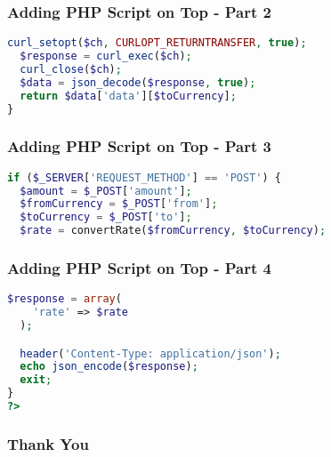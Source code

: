 \documentclass[aspectratio=169, table]{beamer}
\begin{document}
\begin{frame}[fragile]
    \frametitle{Adding PHP Script on Top - Part 2}
    \begin{lstlisting}[language=PHP]
  curl_setopt($ch, CURLOPT_RETURNTRANSFER, true);
  $response = curl_exec($ch);
  curl_close($ch);
  $data = json_decode($response, true);
  return $data['data'][$toCurrency];
}
    \end{lstlisting}
\end{frame}

\begin{frame}[fragile]
    \frametitle{Adding PHP Script on Top - Part 3}
    \begin{lstlisting}[language=PHP]
if ($_SERVER['REQUEST_METHOD'] == 'POST') {
  $amount = $_POST['amount'];
  $fromCurrency = $_POST['from'];
  $toCurrency = $_POST['to'];
  $rate = convertRate($fromCurrency, $toCurrency);
    \end{lstlisting}
\end{frame}

\begin{frame}[fragile]
    \frametitle{Adding PHP Script on Top - Part 4}
    \begin{lstlisting}[language=PHP]
$response = array(
    'rate' => $rate
  );

  header('Content-Type: application/json');
  echo json_encode($response);
  exit;
}
?>
    \end{lstlisting}
\end{frame}

\begin{frame4}
    \frametitle{Thank You}
\end{frame4}
\end{document}
